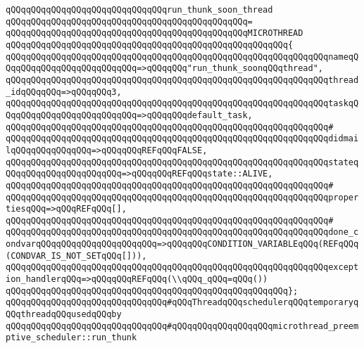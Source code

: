 \verb|qQQqqQQqqQQqqQQqqQQqqQQqqQQqqQQqrun_thunk_soon_thread|\newline
\verb|qQQqqQQqqQQqqQQqqQQqqQQqqQQqqQQqqQQqqQQqqQQqqQQq=|\newline
\verb|qQQqqQQqqQQqqQQqqQQqqQQqqQQqqQQqqQQqqQQqqQQqqQQqMICROTHREAD|\newline
\verb|qQQqqQQqqQQqqQQqqQQqqQQqqQQqqQQqqQQqqQQqqQQqqQQqqQQqqQQq{|\newline
\verb|qQQqqQQqqQQqqQQqqQQqqQQqqQQqqQQqqQQqqQQqqQQqqQQqqQQqqQQqqQQqqQQqnameqQQqqQQqqQQqqQQqqQQqqQQqqQQq=>qQQqqQQq"run_thunk_soonqQQqthread",|\newline
\verb|qQQqqQQqqQQqqQQqqQQqqQQqqQQqqQQqqQQqqQQqqQQqqQQqqQQqqQQqqQQqqQQqthread_idqQQqqQQq=>qQQqqQQq3,|\newline
\verb|qQQqqQQqqQQqqQQqqQQqqQQqqQQqqQQqqQQqqQQqqQQqqQQqqQQqqQQqqQQqqQQqtaskqQQqqQQqqQQqqQQqqQQqqQQqqQQq=>qQQqqQQqdefault_task,|\newline
\verb|qQQqqQQqqQQqqQQqqQQqqQQqqQQqqQQqqQQqqQQqqQQqqQQqqQQqqQQqqQQqqQQq#|\newline
\verb|qQQqqQQqqQQqqQQqqQQqqQQqqQQqqQQqqQQqqQQqqQQqqQQqqQQqqQQqqQQqqQQqdidmailqQQqqQQqqQQqqQQq=>qQQqqQQqREFqQQqFALSE,|\newline
\verb|qQQqqQQqqQQqqQQqqQQqqQQqqQQqqQQqqQQqqQQqqQQqqQQqqQQqqQQqqQQqqQQqstateqQQqqQQqqQQqqQQqqQQqqQQq=>qQQqqQQqREFqQQqstate::ALIVE,|\newline
\verb|qQQqqQQqqQQqqQQqqQQqqQQqqQQqqQQqqQQqqQQqqQQqqQQqqQQqqQQqqQQqqQQq#|\newline
\verb|qQQqqQQqqQQqqQQqqQQqqQQqqQQqqQQqqQQqqQQqqQQqqQQqqQQqqQQqqQQqqQQqpropertiesqQQq=>qQQqREFqQQq[],|\newline
\verb|qQQqqQQqqQQqqQQqqQQqqQQqqQQqqQQqqQQqqQQqqQQqqQQqqQQqqQQqqQQqqQQq#|\newline
\verb|qQQqqQQqqQQqqQQqqQQqqQQqqQQqqQQqqQQqqQQqqQQqqQQqqQQqqQQqqQQqqQQqdone_condvarqQQqqQQqqQQqqQQqqQQqqQQq=>qQQqqQQqCONDITION_VARIABLEqQQq(REFqQQq(CONDVAR_IS_NOT_SETqQQq[])),|\newline
\verb|qQQqqQQqqQQqqQQqqQQqqQQqqQQqqQQqqQQqqQQqqQQqqQQqqQQqqQQqqQQqqQQqexception_handlerqQQq=>qQQqqQQqREFqQQq(\\qQQq_qQQq=qQQq())|\newline
\verb|qQQqqQQqqQQqqQQqqQQqqQQqqQQqqQQqqQQqqQQqqQQqqQQqqQQqqQQq};|\newline
\newline
\verb|qQQqqQQqqQQqqQQqqQQqqQQqqQQqqQQq#qQQqThreadqQQqschedulerqQQqtemporaryqQQqthreadqQQqusedqQQqby|\newline
\verb|qQQqqQQqqQQqqQQqqQQqqQQqqQQqqQQq#qQQqqQQqqQQqqQQqqQQqmicrothread_preemptive_scheduler::run_thunk|\newline
